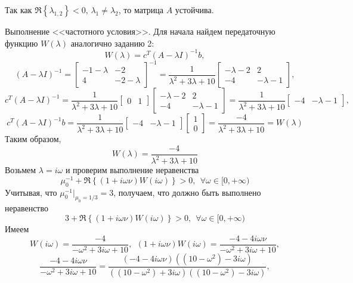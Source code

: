 \documentclass[a4paper, 12pt]{article}
\begin{document}
\begin{compactitem}
        Так как $\Re\left\{\lambda_{1,2}\right\}<0,\,\lambda_1\neq\lambda_2$, то матрица $A$ устойчива.
        \item Выполнение <<частотного условия>>. Для начала найдем передаточную функцию $W(\lambda)$
        аналогично заданию 2: $$W(\lambda)=c^T(A-\lambda I)^{-1}b,$$
        $$(A-\lambda I)^{-1}=
        \begin{bmatrix}
            -1-\lambda & -2\\
            4 & -2-\lambda
        \end{bmatrix}^{-1}=
        \dfrac{1}{\lambda^2+3\lambda+10}
        \begin{bmatrix}
            -\lambda-2 & 2\\
            -4 & -\lambda-1
        \end{bmatrix},$$
        $$
        c^T(A-\lambda I)^{-1}=
        \dfrac{1}{\lambda^2+3\lambda+10}
        \begin{bmatrix}
            0 & 1
        \end{bmatrix}
        \begin{bmatrix}
            -\lambda-2 & 2\\
            -4 & -\lambda-1
        \end{bmatrix}=
        \dfrac{1}{\lambda^2+3\lambda+10}
        \begin{bmatrix}
            -4 & -\lambda-1
        \end{bmatrix},
        $$
        $$
        c^T(A-\lambda I)^{-1}b=
        \dfrac{1}{\lambda^2+3\lambda+10}
        \begin{bmatrix}
            -4 & -\lambda-1
        \end{bmatrix}
        \begin{bmatrix}
            1\\
            0
        \end{bmatrix}=
        \dfrac{-4}{\lambda^2+3\lambda+10}=W(\lambda)
        $$
        Таким образом, $$W(\lambda)=\dfrac{-4}{\lambda^2+3\lambda+10}$$
        Возьмем $\lambda=i\omega$ и проверим выполнение неравенства
        $$\mu_0^{-1}+\Re\left\{(1+i\omega\nu)W(i\omega)\right\}>0,\ \ \forall\omega\in[0,+\infty)$$
        Учитывая, что $\mu_0^{-1}|_{\mu_0=1/3}=3$, получаем, что должно быть выполнено неравенство
        $$3+\Re\left\{(1+i\omega\nu)W(i\omega)\right\}>0,\ \ \forall\omega\in[0,+\infty)$$
        Имеем
        $$W(i\omega)=\dfrac{-4}{-\omega^2+3i\omega+10},\ \ (1+i\omega\nu)W(i\omega)=\dfrac{-4-4i\omega\nu}{-\omega^2+3i\omega+10},$$
        $$\dfrac{-4-4i\omega\nu}{-\omega^2+3i\omega+10}=\dfrac{(-4-4i\omega\nu)((10-\omega^2)-3i\omega)}{((10-\omega^2)+3i\omega)((10-\omega^2)-3i\omega)},$$

\end{compactitem}
\end{document}
